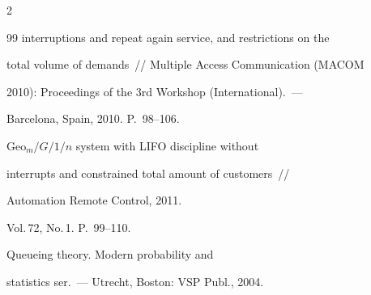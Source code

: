 \begin{multicols}{2}
{{\begin{thebibliography}{99}
interruptions and repeat again service, and restrictions on the


total volume of demands~// Multiple Access Communication (MACOM


2010): Proceedings of the 3rd  Workshop (International).~---


Barcelona, Spain, 2010. P.~98--106.




























Geo$_{m}/G/1/n$ system with LIFO discipline without 


interrupts and constrained total amount of customers~// 


Automation Remote Control, 2011.


Vol.\,72, No.\,1. P.~99--110.














\label{end\stat}











Queueing theory. Modern probability and


statistics ser.~--- Utrecht, Boston: VSP Publ., 2004.


 \end{thebibliography}


}


}








\end{multicols}


